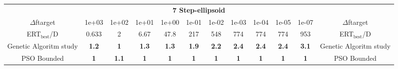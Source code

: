 \begin{tabular}{cccccccccccc}
 & \multicolumn{10}{c}{{\normalsize \textbf{7 Step-ellipsoid}}}\\
$\Delta$ftarget& 1e+03& 1e+02& 1e+01& 1e+00& 1e-01& 1e-02& 1e-03& 1e-04& 1e-05& 1e-07 & $\Delta$ftarget \\
ERT$_{\textrm{best}}$/D& 0.633& 2& 6.67& 47.8& 217& 548& 774& 774& 774& 953 & ERT$_{\textrm{best}}$/D \\
\hline
Genetic Algoritm study & \textbf{1.2} & \textbf{1} & \textbf{1.3} & \textbf{1.3} & \textbf{1.9} & \textbf{2.2} & \textbf{2.4} & \textbf{2.4} & \textbf{2.4} & \textbf{3.1} & Genetic Algoritm study \cite{add_an_entry_for_Genetic Algoritm study_in_bbob.bib}\\
PSO Bounded & \textbf{1} & \textbf{1.1} & \textbf{1} & \textbf{1} & \textbf{1} & \textbf{1} & \textbf{1} & \textbf{1} & \textbf{1} & \textbf{1} & PSO Bounded \cite{add_an_entry_for_PSO Bounded_in_bbob.bib}
\end{tabular}
